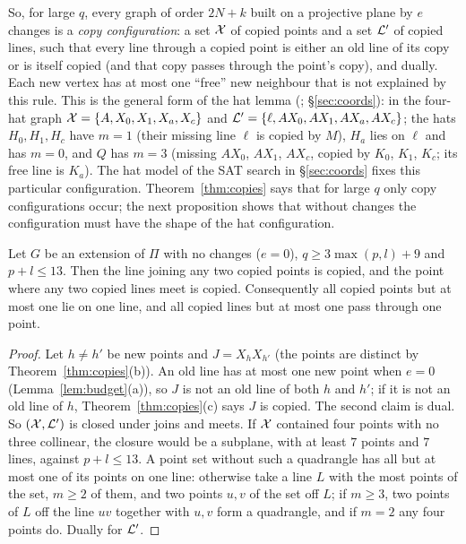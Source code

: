 So, for large $q$, every graph of order $2N+k$ built on a projective plane by $e$ changes is a \emph{copy
configuration}: a set $\mathcal{X}$ of copied points and a set $\mathcal{L}'$ of copied lines, such that every line through a copied point
is either an old line of its copy or is itself copied (and that copy passes through the point's copy), and dually.
Each new vertex has at most one ``free'' new neighbour that is not explained by this rule. This is the
general form of the hat lemma (\cite{AL}; \S\ref{sec:coords}): in the four-hat graph $\mathcal{X} = \{A, X_0, X_1, X_a, X_c\}$
and $\mathcal{L}' = \{\ell, AX_0, AX_1, AX_a, AX_c\}$; the hats $H_0, H_1, H_c$ have $m = 1$ (their missing line $\ell$ is
copied by $M$), $H_a$ lies on $\ell$ and has $m = 0$, and $Q$ has $m = 3$ (missing $AX_0$, $AX_1$, $AX_c$, copied by
$K_0$, $K_1$, $K_c$; its free line is $K_a$). The hat model of the SAT search in \S\ref{sec:coords} fixes this
particular configuration. Theorem~\ref{thm:copies} says that for large $q$ only copy configurations occur; the next
proposition shows that without changes the configuration must have the shape of the hat configuration.

\begin{proposition}\label{prop:closed}
Let $G$ be an extension of $\Pi$ with no changes ($e = 0$), $q \ge 3\max(p,l)+9$ and $p + l \le 13$. Then the line
joining any two copied points is copied, and the point where any two copied lines meet is copied. Consequently all
copied points but at most one lie on one line, and all copied lines but at most one pass through one point.
\end{proposition}
\begin{proof}
Let $h \ne h'$ be new points and $J = X_hX_{h'}$ (the points are distinct by Theorem~\ref{thm:copies}(b)). An old line
has at most one new point when $e = 0$ (Lemma~\ref{lem:budget}(a)), so $J$ is not an old line of both $h$ and $h'$;
if it is not an old line of $h$, Theorem~\ref{thm:copies}(c) says $J$ is copied. The second claim is dual.
So $(\mathcal{X}, \mathcal{L}')$ is closed under joins and meets. If $\mathcal{X}$ contained four points with no three collinear, the closure
would be a subplane, with at least $7$ points and $7$ lines, against $p + l \le 13$. A point set without such a
quadrangle has all but at most one of its points on one line: otherwise take a line $L$ with the most points of the
set, $m \ge 2$ of them, and two points $u, v$ of the set off $L$; if $m \ge 3$, two points of $L$ off the line $uv$
together with $u, v$ form a quadrangle, and if $m = 2$ any four points do. Dually for $\mathcal{L}'$.
\end{proof}

